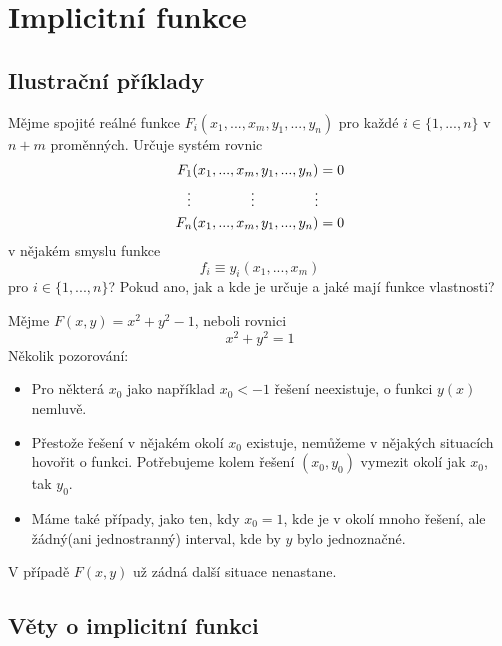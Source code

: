 \documentclass[../main.tex]{subfiles}
\begin{document}
\section{Implicitní funkce}

\subsection{Ilustrační příklady}

\begin{example}[Obecný]
	Mějme spojité reálné funkce $F_i(x_1, ... , x_m, y_1, ... , y_n)$ pro každé $i \in \{1, ..., n\}$
	v $n + m$
	proměnných. Určuje systém rovnic
	\[
		\begin{aligned}
			F_1(x_1, ... , x_m, y_1, ... , y_n) &= 0 \\
			\vdots \hspace{15mm} \vdots \hspace{15mm} \vdots \\
			F_n(x_1, ... , x_m, y_1, ... , y_n) &= 0
		\end{aligned}
\]
	v nějakém smyslu funkce
	\[ f_i \equiv y_i(x_1, ... , x_m) \]
	pro $i \in \{ 1, ... , n \}$? Pokud ano, jak a kde je určuje a jaké mají funkce vlastnosti?
\end{example}

\begin{example}[$F(x,y) = x^2 + y^2 - 1$]
	Mějme $F(x,y) = x^2 + y^2 - 1$, neboli rovnici \[ x^2 + y^2 = 1 \]
	Několik pozorování:
	\begin{itemize}
	    \item Pro některá $x_0$ jako například $x_0 < -1$ řešení neexistuje, o funkci $y(x)$ nemluvě.
	    \item Přestože řešení v nějakém okolí $x_0$ existuje, nemůžeme v nějakých situacích hovořit o funkci.
	    Potřebujeme kolem řešení $(x_0, y_0)$ vymezit okolí jak $x_0$, tak $y_0$.
	    \item Máme také případy, jako ten, kdy $x_0 = 1$, kde je v okolí mnoho řešení, ale žádný(ani
	    jednostranný) interval, kde by $y$ bylo jednoznačné.
	\end{itemize}
	V případě $F(x,y)$ už zádná další situace nenastane.
\end{example}

\subsection{Věty o implicitní funkci}
\end{document}
